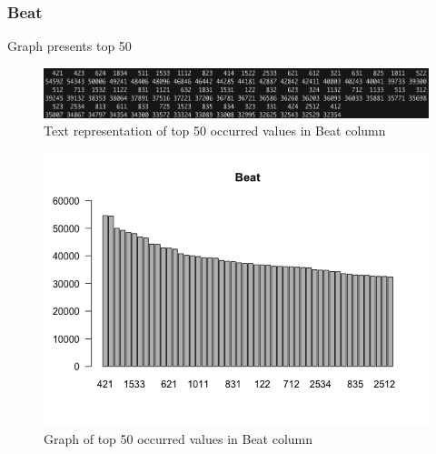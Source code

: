\newpage
\subsubsection{Beat}
Graph presents top 50
\begin{figure}[H]
\includegraphics[scale=0.4]{images/EDA/Beat.jpg}
\centering
\caption{Text representation of top 50 occurred values in Beat column}
\end{figure}
\begin{figure}[H]
\includegraphics[scale=0.7]{images/EDA/Beat.png}
\centering
\caption{Graph of top 50 occurred values in Beat column}
\end{figure}